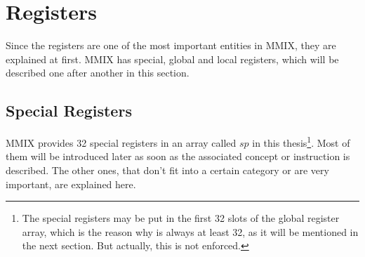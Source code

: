 \section{Registers}

Since the registers are one of the most important entities in MMIX, they are explained at first. MMIX has special, global and local registers, which will be described one after another in this section.

\subsection{Special Registers}

MMIX provides 32 special registers in an array called $sp$ in this thesis\footnote{The special registers may be put in the first 32 slots of the global register array, which is the reason why  is always at least 32, as it will be mentioned in the next section. But actually, this is not enforced.}. Most of them will be introduced later as soon as the associated concept or instruction is described. The other ones, that don't fit into a certain category or are very important, are explained here.


